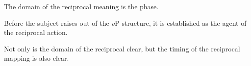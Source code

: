 \documentclass[a0paper,landscape,columns=2]{../includes/tex/baposter}
\begin{document}
\begin{poster}
{The domain of the reciprocal meaning is the phase.

\vspace{.1in}

Before the subject raises out of the $v$P structure, it is established as the
agent of the reciprocal action.

\vspace{.1in}

Not only is the domain of the reciprocal clear, but the timing of the reciprocal mapping is also clear.

\vspace{.05in}

}





%
%




%
%











%
%



%
%




\end{poster}
\end{document}
